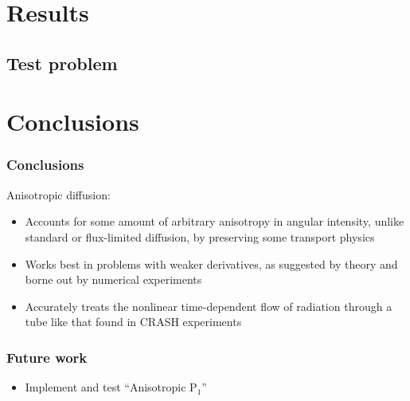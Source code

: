 \documentclass[draft]{beamer}
\begin{document}
\section{Results}
\subsection{Test problem}
\section{Conclusions}
\begin{frame}
  \frametitle{Conclusions}
  Anisotropic diffusion:
  \begin{itemize}
    \item Accounts for some amount of arbitrary anisotropy in angular
      intensity, unlike standard or flux-limited diffusion, by preserving some
      transport physics
    \item Works best in problems with weaker derivatives, as suggested by
      theory and borne out by numerical experiments
    \item Accurately treats the nonlinear time-dependent flow of radiation
      through a tube like that found in CRASH experiments
  \end{itemize}
\end{frame}
\begin{frame}
  \frametitle{Future work}
  \begin{itemize}
    \item Implement and test ``Anisotropic P$_1$''
  \end{itemize}
\end{frame}
\appendix
\end{document}
